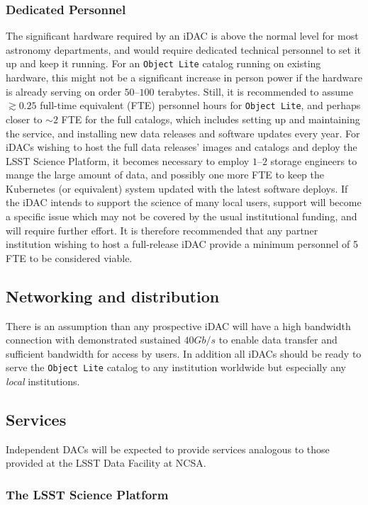 \subsubsection{Dedicated Personnel}
The significant hardware required by an iDAC is above the normal level for most astronomy departments, and would require dedicated technical personnel to set it up and keep it running. For an {\tt Object Lite} catalog running on existing hardware, this might not be a significant increase in person power if the hardware is already serving on order $50$--$100$ terabytes. Still, it is recommended to assume $\gtrsim0.25$ full-time equivalent (FTE) personnel hours for {\tt Object Lite}, and perhaps closer to $\sim2$ FTE for the full catalogs, which includes setting up and maintaining the service, and installing new data releases and software updates every year. For iDACs wishing to host the full data releases' images and catalogs and deploy the LSST Science Platform, it becomes necessary to employ $1$--$2$ storage engineers to mange the large amount of data, and possibly one more FTE to keep the Kubernetes (or equivalent) system updated with the latest software deploys. If the iDAC intends to support the science of many local users, support will become a specific issue which may not be covered by the usual institutional funding, and will require further effort. It is therefore recommended that any partner institution wishing to host a full-release iDAC provide a minimum personnel of 5 FTE to be considered viable.

\subsection{Networking and distribution}
There is an assumption than any prospective iDAC will have a high bandwidth connection with demonstrated sustained $40 Gb/s$ to enable data transfer and sufficient bandwidth for access by users.
In addition all iDACs should be ready  to serve the {\tt Object Lite} catalog to any institution worldwide but especially any {\em local} institutions.

\subsection{Services}

Independent DACs will be expected to provide services analogous to those provided at the LSST Data Facility at NCSA.  

\subsubsection{The LSST Science Platform}

